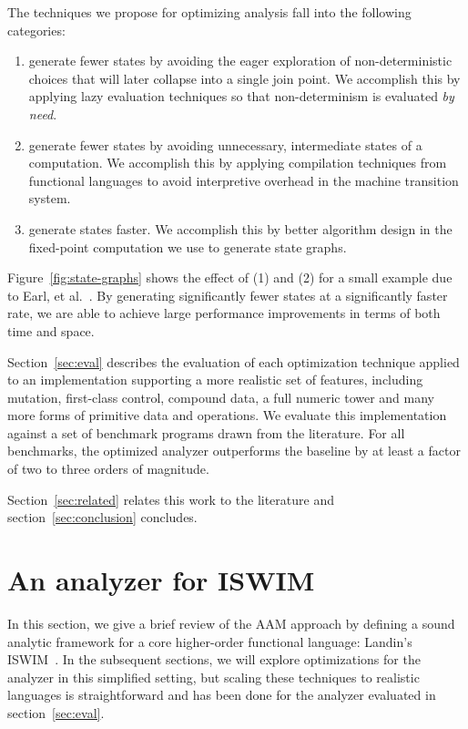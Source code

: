 \documentclass[preprint,onecolumn,9pt]{sigplanconf} %
\begin{document}
The techniques we propose for optimizing analysis fall into the
following categories:
\begin{enumerate}
\item generate fewer states by avoiding the eager exploration of
  non-deterministic choices that will later collapse into a single
  join point.  We accomplish this by applying lazy evaluation
  techniques so that non-determinism is evaluated \emph{by need}.

\item generate fewer states by avoiding unnecessary, intermediate
  states of a computation.  We accomplish this by applying compilation
  techniques from functional languages to avoid interpretive overhead
  in the machine transition system.

\item generate states faster.  We accomplish this by better algorithm
  design in the fixed-point computation we use to generate state graphs.
\end{enumerate}
Figure~\ref{fig:state-graphs} shows the effect of (1) and (2) for a
small example due to Earl, et
al.~\cite{dvanhorn:Earl2012Introspective}.
By generating significantly fewer states at a significantly faster
rate, we are able to achieve large performance improvements in terms
of both time and space.

Section~\ref{sec:eval} describes the evaluation of each optimization
technique applied to an implementation supporting a more realistic set
of features, including mutation, first-class control, compound data, a
full numeric tower and many more forms of primitive data and
operations.
%
We evaluate this implementation against a set of benchmark programs
drawn from the literature.
%
For all benchmarks, the optimized analyzer outperforms the baseline
by at least a factor of
two to
three orders of magnitude.

Section~\ref{sec:related} relates this work to the literature and
section~\ref{sec:conclusion} concludes.

\section{An analyzer for ISWIM}
\label{sec:aam}

In this section, we give a brief review of the AAM approach by
defining a sound analytic framework for a core higher-order functional
language: Landin's ISWIM~\cite{dvanhorn:Landin1966Next}.  In the
subsequent sections, we will explore optimizations for the analyzer in
this simplified setting, but scaling these techniques to realistic
languages is straightforward and has been done for the analyzer
evaluated in section~\ref{sec:eval}.
\end{document}
